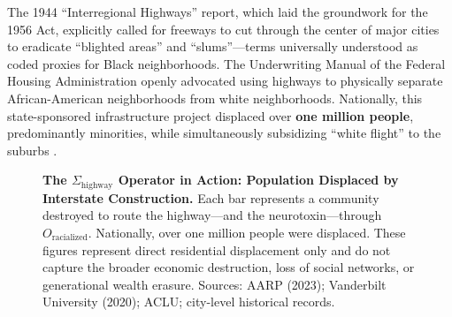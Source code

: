 \documentclass[12pt,openany]{book}
\begin{document}
The 1944 ``Interregional Highways'' report, which laid the groundwork for the 1956 Act, explicitly called for freeways to cut through the center of major cities to eradicate ``blighted areas'' and ``slums''---terms universally understood as coded proxies for Black neighborhoods. The Underwriting Manual of the Federal Housing Administration openly advocated using highways to physically separate African-American neighborhoods from white neighborhoods. Nationally, this state-sponsored infrastructure project displaced over \textbf{one million people}, predominantly minorities, while simultaneously subsidizing ``white flight'' to the suburbs \cite{tel_displacement}.

\begin{figure}[htbp]
\centering
{}
\caption{\textbf{The $\Sigma_{\text{highway}}$ Operator in Action: Population Displaced by Interstate Construction.} Each bar represents a community destroyed to route the highway---and the neurotoxin---through $O_{\text{racialized}}$. Nationally, over one million people were displaced. These figures represent direct residential displacement only and do not capture the broader economic destruction, loss of social networks, or generational wealth erasure. Sources: AARP (2023); Vanderbilt University (2020); ACLU; city-level historical records.}
\label{fig:highway_displacement}
\end{figure}
\end{document}
